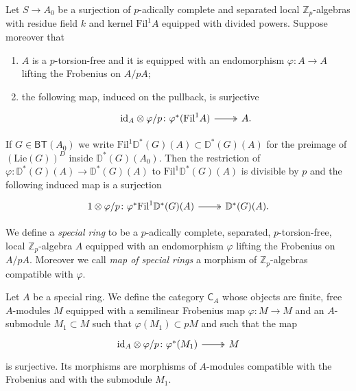 \documentclass[../Main]{subfiles}
\begin{document}
\begin{lem}
	Let $S \to A_0$ be a surjection of $p$-adically complete
	and separated local $\mathbb{Z}_{p}$-algebras with residue field
	$k$ and kernel $\mathrm{Fil}^1 A$ equipped with divided powers.
	Suppose moreover that
\begin{enumerate}
	\item $A$ is a $p$-torsion-free and it is equipped with an endomorphism
		$\varphi\colon A \to A$ lifting the Frobenius on $A/pA$;
		
	\item the following map, induced on the pullback, is surjective
		\begin{equation*}
		\begin{tikzcd}
			\mathrm{id}_{ A } \otimes \varphi/p \colon
			\varphi^*(\mathrm{Fil}^1 A)
			\arrow[r, "", twoheadrightarrow] &
			A
		.\end{tikzcd}
		\end{equation*}
\end{enumerate}
	If $G \in \mathsf{BT}(A_0)$ we write $\mathrm{Fil}^1 \mathbb{D}^*(G)(A) \subset \mathbb{D}^*(G)(A)$
	for the preimage of $\left( \mathrm{Lie}(G) \right)^D$ inside $\mathbb{D}^*(G)(A_0)$.
	Then the restriction of $\varphi\colon \mathbb{D}^*(G)(A) \to \mathbb{D}^*(G)(A)$
	to $\mathrm{Fil}^1 \mathbb{D}^*(G)(A)$ is divisible by $p$ and the following induced map
	is a surjection
	\begin{equation*}
	\begin{tikzcd}
		1 \otimes \varphi/p \colon
		\varphi^*\mathrm{Fil}^1 \mathbb{D}^*(G)(A)
		\arrow[r, "", twoheadrightarrow] &
		\mathbb{D}^*(G)(A)
	.\end{tikzcd}
	\end{equation*}
\end{lem} 


\begin{defn}
	We define a {\em special ring} to be a $p$-adically complete, separated, $p$-torsion-free,
	local $\mathbb{Z}_{p}$-algebra $A$ equipped with an endomorphism $\varphi$
	lifting the Frobenius on $A/pA$.
	Moreover we call {\em map of special rings} a morphism
	of $\mathbb{Z}_{p}$-algebras compatible with $\varphi$.
\end{defn}


\begin{defn}[]
	Let $A$ be a special ring. We define the category
	$\mathsf{C}_A$ whose objects are finite, free $A$-modules
	$M$ equipped with a semilinear Frobenius map $\varphi\colon M \to M$
	and an $A$-submodule $M_1 \subset M$ such that $\varphi(M_1) \subset pM$
	and such that the map
	\begin{equation*}
	\begin{tikzcd}[row sep = 0ex
		,/tikz/column 1/.append style={anchor=base east}
		,/tikz/column 2/.append style={anchor=base west}]
		\mathrm{id}_{ A }\otimes\varphi/p\colon 
		\varphi^*(M_1) \arrow[r, "", twoheadrightarrow] &
		M
	\end{tikzcd}
	\end{equation*} 
	is surjective.
	Its morphisms are morphisms of $A$-modules compatible with
	the Frobenius and with the submodule $M_1$.
\end{defn}
\end{document}
